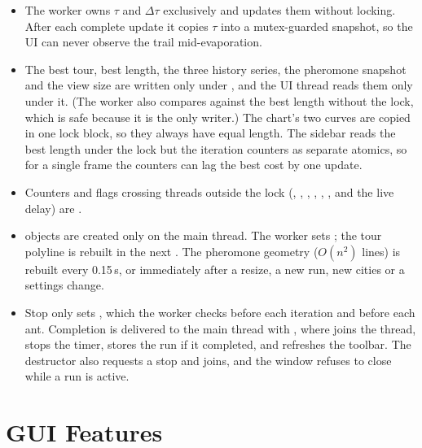 \documentclass[11pt,a4paper]{article}
\begin{document}
\begin{itemize}
  \item The worker owns $\tau$ and $\Delta\tau$ exclusively and updates them without locking. After each
        complete update it copies $\tau$ into a mutex-guarded snapshot, so the UI can never observe the trail
        mid-evaporation.
  \item The best tour, best length, the three history series, the pheromone snapshot and the view size are
        written only under , and the UI thread reads them only under it. (The worker
        also compares against the best length without the lock, which is safe because it is the only
        writer.) The chart's two curves are copied in one lock block, so they always have equal length.
        The sidebar reads the best length under the lock but the iteration counters as separate atomics,
        so for a single frame the counters can lag the best cost by one update.
  \item \sloppy Counters and flags crossing threads outside the lock (,
        , , , ,
        , and the live  delay) are .
  \item {} objects are created only on the main thread. The worker sets
        ; the tour polyline is rebuilt in the next . The pheromone
        geometry ($O(n^2)$ lines) is rebuilt every 0.15\,s, or immediately after a resize, a new run, new cities
        or a settings change.
  \item Stop only sets , which the worker checks before each iteration and before each
        ant. Completion is delivered to the main thread with , where
         joins the thread, stops the timer, stores the run if it completed,
        and refreshes the toolbar. The  destructor also requests a stop and joins, and the window
        refuses to close while a run is active.
\end{itemize}

\section{GUI Features}
\end{document}
